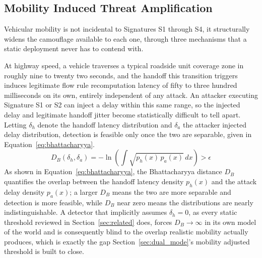 \documentclass[final,5p,twocolumn]{elsarticle}
\theoremstyle{remark}
\theoremstyle{plain}
\begin{document}
\subsection{Mobility Induced Threat Amplification}
\label{sec:mobility_amplification}

Vehicular mobility is not incidental to Signatures S1 through S4, it
structurally widens the camouflage available to each one, through three
mechanisms that a static deployment never has to contend with.

At highway speed, a vehicle traverses a typical roadside unit coverage
zone in roughly nine to twenty two seconds, and the handoff this
transition triggers induces legitimate flow rule recomputation latency of
fifty to three hundred milliseconds on its own, entirely independent of
any attack. An attacker executing Signature S1 or S2 can inject a delay
within this same range, so the injected delay and legitimate handoff
jitter become statistically difficult to tell apart. Letting $\delta_h$
denote the handoff latency distribution and $\delta_a$ the attacker
injected delay distribution, detection is feasible only once the two are
separable, given in Equation~\eqref{eq:bhattacharyya}.
\begin{equation}
	D_B(\delta_h, \delta_a) = -\ln\left(\int \sqrt{p_h(x)\,p_a(x)}\,dx\right) > \epsilon
	\label{eq:bhattacharyya}
\end{equation}
As shown in Equation~\eqref{eq:bhattacharyya}, the Bhattacharyya distance
$D_B$ quantifies the overlap between the handoff latency density $p_h(x)$
and the attack delay density $p_a(x)$; a larger $D_B$ means the two are
more separable and detection is more feasible, while $D_B$ near zero
means the distributions are nearly indistinguishable. A detector that
implicitly assumes $\delta_h{=}0$, as every static threshold reviewed in
Section~\ref{sec:related} does, forces $D_B\to\infty$ in its own model of
the world and is consequently blind to the overlap realistic mobility
actually produces, which is exactly the gap Section~\ref{sec:dual_mode}'s
mobility adjusted threshold is built to close.
\end{document}
